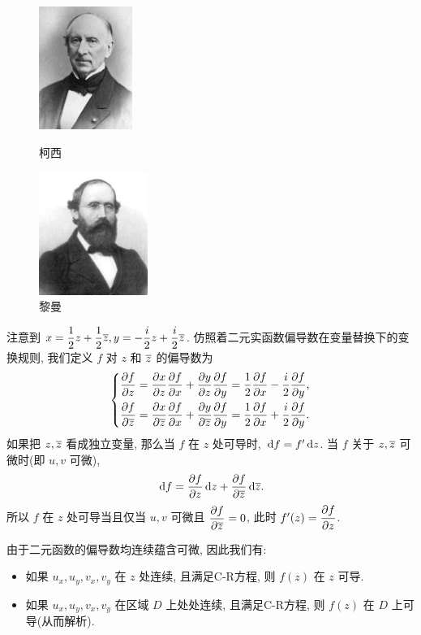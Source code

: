 \begin{figure}[htbp]
  \begin{minipage}{.45\columnwidth}
    \centering
    \includegraphics[height=40mm]{../image/Cauchy.jpeg}
    \caption{柯西}
  \end{minipage}
  \begin{minipage}{.45\columnwidth}
    \centering
    \includegraphics[height=40mm]{../image/Riemann.jpeg}
    \caption{黎曼}
  \end{minipage}
\end{figure}

注意到 $x=\dfrac12z+\dfrac12\overline z,y=-\dfrac i2z+\dfrac i2\overline z$.
仿照着二元实函数偏导数在变量替换下的变换规则, 我们定义 $f$ 对 $z$ 和 $\overline z$ 的偏导数为
  \[\left\{\begin{aligned}
      \dfrac{\partial f}{\partial z}&
    =\dfrac{\partial x}{\partial z}\dfrac{\partial f}{\partial x}+\dfrac{\partial y}{\partial z}\dfrac{\partial f}{\partial y}
    =\frac12\dfrac{\partial f}{\partial x}-\frac i2\dfrac{\partial f}{\partial y},\\
      \dfrac{\partial f}{\partial \overline z}&
    =\dfrac{\partial x}{\partial \overline z}\dfrac{\partial f}{\partial x}+\dfrac{\partial y}{\partial \overline z}\dfrac{\partial f}{\partial y}
    =\frac12\dfrac{\partial f}{\partial x}+\frac i2\dfrac{\partial f}{\partial y}.
  \end{aligned}\right.\]
如果把 $z,\overline z$ 看成独立变量, 那么当 $f$ 在 $z$ 处可导时, $\,\mathrm{d} f=f'\,\mathrm{d} z$.
当 $f$ 关于 $z,\overline z$ 可微时(即 $u,v$ 可微),
  \[\,\mathrm{d} f=\dfrac{\partial f}{\partial z}\,\mathrm{d} z+\dfrac{\partial f}{\partial \overline z}\,\mathrm{d}\overline z.\]
所以 \alert{$f$ 在 $z$ 处可导当且仅当 $u,v$ 可微且 $\dfrac{\partial f}{\partial \overline z}=0$, 此时 $f'(z)=\dfrac{\partial f}{\partial z}$.}

由于二元函数的偏导数均连续蕴含可微, 因此我们有:

\begin{theorem}[连续偏导蕴含可导]
	\begin{itemize}
		\item 如果 $u_x,u_y,v_x,v_y$ 在 $z$ 处连续, 且满足C-R方程, 则 $f(z)$ 在 $z$ 可导.
		\item 如果 $u_x,u_y,v_x,v_y$ 在区域 $D$ 上处处连续, 且满足C-R方程, 则 $f(z)$ 在 $D$ 上可导(从而解析).
	\end{itemize}
\end{theorem}


